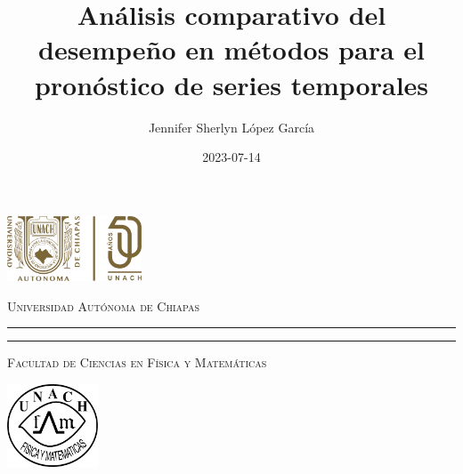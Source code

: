 \documentclass[
  us-letterpaper,
]{scrreprt}
\title{Análisis comparativo del desempeño en métodos para el pronóstico
de series temporales}
\author{Jennifer Sherlyn López García}
\date{2023-07-14}
\theoremstyle{definition}
\theoremstyle{plain}
\theoremstyle{plain}
\theoremstyle{definition}
\theoremstyle{remark}
\begin{document}
\begin{titlepage}
\hspace{-1.7cm} %
\begin{minipage}[t][0.03\textheight][c]{0.22\textwidth}
        \includegraphics[width=4.0cm]{LOGO50.png}
\end{minipage}\hspace{0.9cm}
\begin{minipage}[t][0.03\textheight][c]{0.69\textwidth}
\begin{center}
                \textsc{\huge Universidad Autónoma de Chiapas}\\[0.3cm]
                \hrule height 2.5pt
                \vspace{0.2cm}
                \hrule height1pt
                \vspace{0.3cm}
                \textsc{\Large Facultad de Ciencias en Física y Matemáticas}
\end{center}
\end{minipage}\hspace{0.2cm}
\begin{minipage}[t][0.03\textheight][c]{0.2\textwidth}
		\includegraphics[width=2.7cm]{logofcfm.png}
\end{minipage}\\
\begin{minipage}[t][0.93\textheight][c]{0.06\textwidth}
\vspace{60pt}
    \begin{center}
        \vrule width1pt height18cm
        \vspace{5mm}
        \vrule width2.5pt height18cm
        \vspace{5mm}
        \vrule width1pt height18cm
   \end{center}
\end{minipage}\hspace{1.3cm} %
\begin{minipage}[t][0.95\textheight][c]{0.76\textwidth}


\end{minipage}
\end{titlepage}
\end{document}
